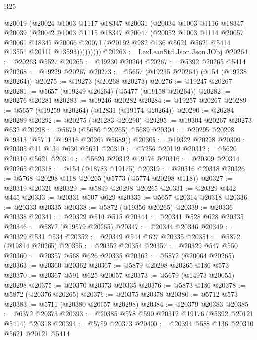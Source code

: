 \begin{lexlean}{R25}
\begin{coremodule}
            @20019
            (@20024
              @1003
              @1117
              @18347
              @20031
              (@20034
                @1003
                @1116
                @18347
                @20039
                (@20042
                  @1003
                  @1115
                  @18347
                  @20047
                  (@20052
                    @1003
                    @1114
                    @20057
                    @20061
                    @18347
                    @20066
                    @20071
                    (@20192 @982 @136 @5621 @5621 @5414 @13551 @20110 @13593)))))))))
@20263 := LexLeanStd.Json.Json.JObj
@20264 := @20263 @5527
@20265 := @19230 @20264
@20267 := @5392 @20265 @5414
@20268 := @19229 @20267
@20273 := @5657 (@19235 @20264) (@154 (@19238 @20264))
@20275 := @19273 (@20268 @20273)
@20276 := @19247 @20267
@20281 := @5657 (@19249 @20264) (@5477 (@19158 @20264))
@20282 := @20276 @20281
@20283 := @19246 @20282
@20284 := @19257 @20267
@20289 := @5657 (@19259 @20264) (@12831 (@19174 @20264))
@20290 := @20284 @20289
@20292 := @20275 (@20283 @20290)
@20295 := @19304 @20267 @20273 @632
@20298 := @5679 (@5686 @20265) @5689
@20304 := @20295 @20298 @19313 (@5711 (@19316 @20267 @5689))
@20305 := @19322 @20298
@20309 := @20305 @11 @134 @630 @5621
@20310 := @7256 @20119
@20312 := @5620 @20310 @5621
@20314 := @5620 @20312 @19176
@20316 := @20309 @20314 @20265
@20318 := @154 (@18783 @19175)
@20319 := @20316 @20318
@20326 := @5768 @20298 @118 @20265 (@5773 (@5774 @20298 @118))
@20327 := @20319 @20326
@20329 := @5849 @20298 @20265
@20331 := @20329 @442 @445
@20333 := @20331 @507 @629
@20335 := @5657 @20314 @20318
@20336 := @20333 @20335
@20338 := @5872 (@19356 @20265)
@20339 := @20336 @20338
@20341 := @20329 @510 @515
@20344 := @20341 @528 @628 @20335
@20346 := @5872 (@19579 @20265)
@20347 := @20344 @20346
@20349 := @20329 @531 @534
@20352 := @20349 @544 @627 @20335
@20354 := @5872 (@19814 @20265)
@20355 := @20352 @20354
@20357 := @20329 @547 @550
@20360 := @20357 @568 @626 @20335
@20362 := @5872 (@20064 @20265)
@20363 := @20360 @20362
@20367 := @5879 @20298 @20265 @186 @573
@20370 := @20367 @591 @625 @20057
@20373 := @5679 (@14973 @20055) @20298
@20375 := @20370 @20373 @20335
@20376 := @5873 @186
@20378 := @5872 (@20376 @20265)
@20379 := @20375 @20378
@20380 := @5712 @573
@20383 := @5711 (@20380 @20057 @20298)
@20384 := @20379 @20383
@20385 := @6372 @20373
@20393 := @20385 @578 @590 @20312 @19176 (@5392 @20121 @5414) @20318
@20394 := @5759 @20373
@20400 := @20394 @588 @136 @20310 @5621 @20121 @5414

\end{coremodule}
\end{lexlean}
